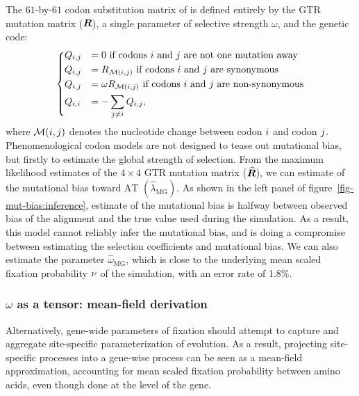 The $61$-by-$61$ codon substitution matrix of \citet{Muse1994} is defined entirely by the \acrshort{GTR} mutation matrix ($\bm{R}$), a single parameter of selective strength $\omega$, and the genetic code:
\begin{equation}
    \begin{dcases}
        Q_{{i}, {j}} & = 0 \text{ if codons ${i}$ and ${j}$ are not one mutation away} \\
        Q_{{i}, {j}} & = R_{\mathcal{M}({i}, {j})} \text{ if codons ${i}$ and ${j}$ are synonymous} \\
        Q_{{i}, {j}} & = \omega R_{\mathcal{M}({i}, {j})} \text{ if codons ${i}$ and ${j}$ are non-synonymous} \\
        Q_{{i}, {i}} & = - \sum\limits_{{j} \neq {i}} Q_{{i}, {j}},
    \end{dcases}
    \label{eq:codon-muse-gaut}
\end{equation}
where $\mathcal{M}({i}, {j})$ denotes the nucleotide change between codon ${i}$ and codon ${j}$.
Phenomenological codon models are not designed to tease out mutational bias, but firstly to estimate the global strength of selection.
From the maximum likelihood estimates of the $4 \times 4$ \acrshort{GTR} mutation matrix ($\widehat{\bm{R}}$), we can estimate of the mutational bias toward $\mathrm{AT}$ $\left({\widehat{\lambda}_{\text{MG}}} \right)$.
As shown in the left panel of figure~\ref{fig-mut-bias:inference}, estimate of the mutational bias is halfway between observed bias of the alignment and the true value used during the simulation.
As a result, this model cannot reliably infer the mutational bias, and is doing a compromise between estimating the selection coefficients and mutational bias.
We can also estimate the parameter ${\widehat{\omega}_{\text{MG}}}$, which is close to the underlying mean scaled fixation probability $\nu$ of the simulation, with an error rate of 1.8\%.

\subsubsection{$\omega$ as a tensor: mean-field derivation}

Alternatively, gene-wide parameters of fixation should attempt to capture and aggregate site-specific parameterization of evolution.
As a result, projecting site-specific processes into a gene-wise process can be seen as a mean-field approximation, accounting for mean scaled fixation probability between amino acids, even though done at the level of the gene.

